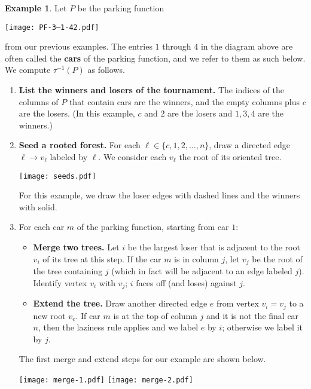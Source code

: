 \documentclass[11pt]{amsart}
\numberwithin{thm}{section}
\numberwithin{equation}{section}
\numberwithin{figure}{section}
\theoremstyle{definition}
\newtheorem{example}[thm]{Example}
\begin{document}
\begin{example}
 Let $P$ be the parking function
 \begin{center}
 \texttt{[image: PF-3--1-42.pdf]}
 \end{center} from our previous examples.  The entries $1$ through $4$ in the diagram above are often called the \textbf{cars} of the parking function, and we refer to them as such below.  We compute $\tau^{-1}(P)$ as follows.
 
 \begin{enumerate}
     \item \textbf{List the winners and losers of the tournament.}  The indices of the columns of $P$ that contain cars are the winners, and the empty columns plus $c$ are the losers.  (In this example, $c$ and $2$ are the losers and $1,3,4$ are the winners.)  
     \item \textbf{Seed a rooted forest.}  For each $\ell\in \{c,1,2,\ldots,n\}$, draw a directed edge $\ell \rightarrow v_\ell$ labeled by $\ell$.  We consider each $v_\ell$ the root of its oriented tree.  
     \begin{center}
         \texttt{[image: seeds.pdf]}
     \end{center}
     For this example, we draw the loser edges with dashed lines and the winners with solid.  
     \item For each car $m$ of the parking function, starting from car $1$:
     \begin{itemize}
         \item \textbf{Merge two trees.}  Let $i$ be the largest loser that is adjacent to the root $v_i$ of its tree at this step.  If the car $m$ is in column $j$, let $v_j$ be the root of the tree containing $j$ (which in fact will be adjacent to an edge labeled $j$).   Identify vertex $v_i$ with $v_j$; $i$ faces off (and loses) against $j$.
         
         \item \textbf{Extend the tree.} Draw another directed edge $e$ from vertex $v_i=v_j$ to a new root $v_e$.  If car $m$ is at the top of column $j$ and it is not the final car $n$, then the laziness rule applies and we label $e$ by $i$; otherwise we label it by $j$. 
     \end{itemize}
         The first merge and extend steps for our example are shown below.
    \begin{center}
     \texttt{[image: merge-1.pdf]} \hspace{4cm}
     \texttt{[image: merge-2.pdf]}


\end{center}
\end{enumerate}
\end{example}
\end{document}
